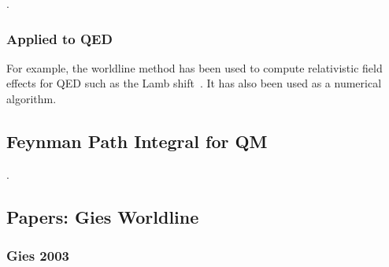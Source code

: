 \cite{McKeon1993, Strassler1992,Schubert2001}



\cite{Schubert2001}.  

\subsubsection{Applied to QED}

For example, the worldline method has been used to compute relativistic field effects for QED such
 as the Lamb shift~\cite{Schmidt1995}.  It has also been used as a numerical algorithm\cite{Mazur2014}.

\subsection{Feynman Path Integral for QM}

\cite{Feynman1948,Feynman1965,Brown2005}.

\subsection{Papers: Gies Worldline}

\subsubsection{Gies 2003}
\cite{Gies2003}

